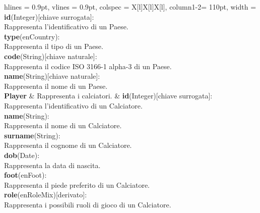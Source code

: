 \begin{tblr}{
    hlines = {0.9pt}, vlines = {0.9pt}, colspec = {X[l]X[l]X[l]}, column{1-2}= {110pt},
    width = \textwidth
}
	{
		\textbf{id}(Integer)[chiave surrogata]:\\Rappresenta
			l'identificativo di un Paese.\\
		\medskip\textbf{type}(enCountry):\\Rappresenta
			il tipo di un Paese.\\
		\medskip\textbf{code}(String)[chiave naturale]:
			\\Rappresenta il codice ISO 3166-1 alpha-3
			di un Paese.\\
		\medskip\textbf{name}(String)[chiave naturale]:
			\\Rappresenta il nome di un Paese.
	}
	\\
	{
		\textbf{Player}
	}
	&
	{
		Rappresenta i calciatori.
	}
	&
	{
		\textbf{id}(Integer)[chiave surrogata]:\\Rappresenta
			l'identificativo di un Calciatore.\\
		\medskip\textbf{name}(String):\\Rappresenta
			il nome di un Calciatore.\\
		\medskip\textbf{surname}(String):\\Rappresenta
			il cognome di un Calciatore.\\
		\medskip\textbf{dob}(Date):\\Rappresenta
			la data di nascita.\\
		\medskip\textbf{foot}(enFoot):\\Rappresenta
			il piede preferito di un Calciatore.\\
		\medskip\textbf{role}(enRoleMix)[derivato]:
			\\Rappresenta i possibili ruoli di gioco
			di un Calciatore.
	}
	\\
\end{tblr}


\newpage


